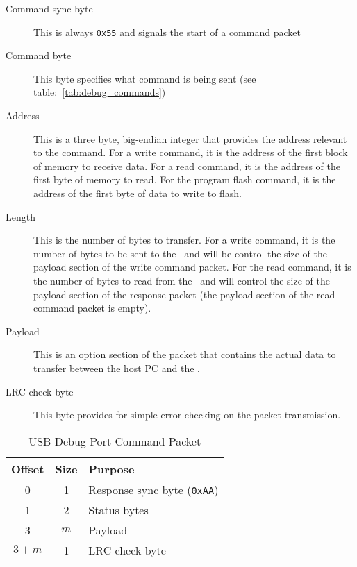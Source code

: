 \begin{description}
    \item[Command sync byte] This is always \verb+0x55+ and signals the start of a command packet

    \item[Command byte] This byte specifies what command is being sent (see table:~\ref{tab:debug_commands})

    \item[Address] This is a three byte, big-endian integer that provides the address relevant to the command. For a write command, it is the address of the first block of memory to receive data. For a read command, it is the address of the first byte of memory to read. For the program flash command, it is the address of the first byte of data to write to flash.

    \item[Length] This is the number of bytes to transfer. For a write command, it is the number of bytes to be sent to the \jr\ and will be control the size of the payload section of the write command packet. For the read command, it is the number of bytes to read from the \jr\ and will control the size of the payload section of the response packet (the payload section of the read command packet is empty).

    \item[Payload] This is an option section of the packet that contains the actual data to transfer between the host PC and the \jr.

    \item[LRC check byte] This byte provides for simple error checking on the packet transmission.
\end{description}

\begin{table}[ht]
    \begin{center}
        \begin{tabular}{|c|c|l|} \hline
            Offset & Size & Purpose \\ \hline\hline
            0 & 1 & Response sync byte (\verb+0xAA+)\\ \hline
            1 & 2 & Status bytes \\ \hline
            3 & $m$ & Payload \\ \hline
            $3 + m$ & 1 & LRC check byte \\ \hline
        \end{tabular}
    \end{center}
    \caption{USB Debug Port Command Packet}
    \label{tab:debug_resp_packet}
\end{table}


